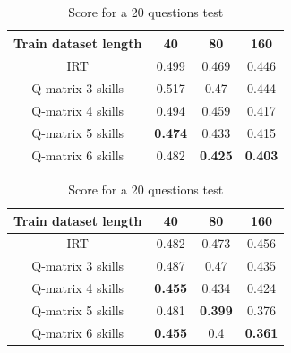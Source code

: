 \documentclass{sig-alternate}
\begin{document}
\begin{table}
\begin{tabular}{cccc}
\bfseries Train dataset length & 40 & 80 & 160\\
\hline
IRT & 0.499 & 0.469 & 0.446\\
Q-matrix 3 skills & 0.517 & 0.47 & 0.444\\
Q-matrix 4 skills & 0.494 & 0.459 & 0.417\\
Q-matrix 5 skills & \textbf{0.474} & 0.433 & 0.415\\
Q-matrix 6 skills & 0.482 & \textbf{0.425} & \textbf{0.403}\\
\end{tabular}
\caption{Score for a 40 questions test}

\begin{tabular}{cccc}
\bfseries Train dataset length & 40 & 80 & 160\\
\hline
IRT & 0.482 & 0.473 & 0.456\\
Q-matrix 3 skills & 0.487 & 0.47 & 0.435\\
Q-matrix 4 skills & \textbf{0.455} & 0.434 & 0.424\\
Q-matrix 5 skills & 0.481 & \textbf{0.399} & 0.376\\
Q-matrix 6 skills & \textbf{0.455} & 0.4 & \textbf{0.361}\\
\end{tabular}
\caption{Score for a 20 questions test}
\end{table}
\end{document}
